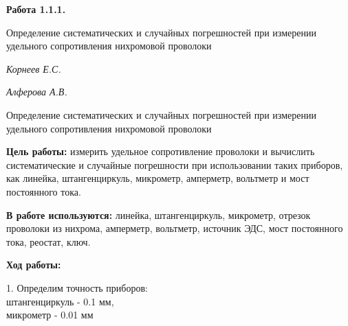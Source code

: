 \documentclass[14pt]{article}
\begin{document}
	\begin{titlepage}
	\begin{center}
		\fontsize{18pt}{20pt}\selectfont
		\textbf{Работа 1.1.1.}	
	
		\vspace{5cm}
		\fontsize{24pt}{25pt}\selectfont
		Определение систематических и случайных погрешностей при измерении удельного сопротивления нихромовой
		проволоки
	\end{center}
	\begin{flushright}
		\fontsize{18pt}{20pt}\selectfont
		\vspace{13cm}
		\hspace{-3cm}
		\textit{Корнеев Е.С.}
	
		\textit{Алферова А.В.}
	\end{flushright}		
	
	\end{titlepage}


	\begin{center}
	\fontsize{16pt}{18pt}\selectfont	
	Определение систематических и случайных погрешностей при измерении удельного сопротивления нихромовой
	проволоки
	\end{center}
	
	\fontsize{14pt}{16pt}\selectfont
	\vspace{1cm}
	\textbf{Цель работы:} измерить удельное сопротивление проволоки и вычислить систематические и случайные 									погрешности при использовании таких приборов, как линейка, штангенциркуль, микрометр, амперметр, вольтметр и мост 						постоянного тока.
	
	\vspace{0.5cm}
	\textbf{В работе используются:} линейка, штангенциркуль, микрометр, отрезок проволоки из нихрома, амперметр, вольтметр, 	источник 		ЭДС, мост постоянного тока, реостат, ключ.
	
	\vspace{1cm}
	\textbf{Ход работы:}
	\vspace{0.5cm}
	
	1. Определим точность приборов: \\
	\hspace*{2cm}штангенциркуль - 0.1 мм,\\
	\hspace*{2cm}микрометр - 0.01 мм
	
\end{document}
